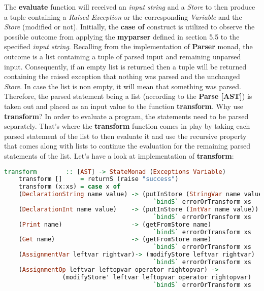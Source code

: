 \documentclass[a4paper, onecolumn]{article}
\begin{document}
    \noindent The \textbf{evaluate} function will received an \textit{input string} and a \textit{Store} to then produce a tuple containing a \textit{Raised Exception} or the corresponding \textit{Variable} and the \textit{Store} (modified or not). Initially, the \textbf{case of} construct is utilized to observe the possible outcome from applying the \textbf{my\textunderscore parser} defined in section 5.5 to the specified \textit{input string}. Recalling from the implementation of \textbf{Parser} monad, the outcome is a list containing a tuple of parsed input and remaining unparsed input. Consequently, if an empty list is returned then a tuple will be returned containing the raised exception that nothing was parsed and the unchanged \textit{Store}. In case the list is non empty, it will mean that something was parsed. Therefore, the parsed statement being a list (according to the \textbf{Parse [AST]}) is taken out and placed as an input value to the function \textbf{transform}. Why use \textbf{transform}? In order to evaluate a program, the statements need to be parsed separately. That's where the \textbf{transform} function comes in play by taking each parsed statement of the list to then evaluate it and use the recursive property that comes along with lists to continue the evaluation for the remaining parsed statements of the list. Let's have a look at implementation of \textbf{transform}:
    
    \begin{tcolorbox}
    \begin{lstlisting}[language=Haskell] 
    transform        :: [AST] -> StateMonad (Exceptions Variable) 
    transform []     = returnS (raise "success")
    transform (x:xs) = case x of 
    (DeclarationString name value) -> (putInStore (StringVar name value))
                                         `bindS` errorOrTransform xs
    (DeclarationInt name value)    -> (putInStore (IntVar name value))
                                         `bindS` errorOrTransform xs
    (Print name)                   -> (getFromStore name)
                                         `bindS` errorOrTransform xs
    (Get name)                     -> (getFromStore name)
                                         `bindS` errorOrTransform xs
    (AssignmentVar leftvar rightvar)-> (modifyStore leftvar rightvar)
                                         `bindS` errorOrTransform xs
    (AssignmentOp leftvar leftopvar operator rightopvar) ->
                (modifyStore' leftvar leftopvar operator rightopvar) 
                                         `bindS` errorOrTransform xs
    \end{lstlisting}
    \end{tcolorbox}
    
\end{document}

